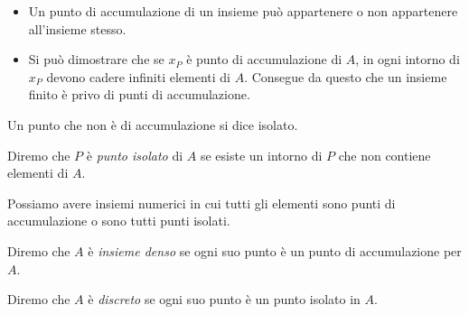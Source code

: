 \begin{newoss}{}{}
\begin{itemize} [nosep]
\item Un punto di accumulazione di un insieme può appartenere 
o non appartenere all'insieme stesso.
\item Si può dimostrare che se \(x_P\) è punto di 
accumulazione di \(A\), in ogni intorno di \(x_P\) devono cadere infiniti 
elementi di \(A\). Consegue da questo che un insieme finito è privo di punti 
di accumulazione.
\end{itemize}
\end{newoss}

Un punto che non è di accumulazione si dice isolato.
% 

\begin{newdef}{}{}
Diremo che \(P\) è \emph{punto isolato} di \(A\) se esiste un intorno 
di \(P\) che non contiene elementi di \(A\).
\end{newdef}

Possiamo avere insiemi numerici in cui tutti gli elementi sono punti di 
accumulazione o sono tutti punti isolati.

\begin{newdef}{}{}
Diremo che \(A\) è \emph{insieme denso} se ogni suo punto è un punto di 
accumulazione per \(A\).
\end{newdef}

\begin{newdef}{}{}
Diremo che \(A\) è \emph{discreto} se ogni suo punto è un punto isolato in 
\(A\).
\end{newdef}

\begin{comment}
\affiancati{.48}{.48}{
\begin{newdef}{}{}
:
\[\]
\end{newdef}
}{
\begin{newdef}{}{}
:
\[\]
\end{newdef}
}
\end{comment}

